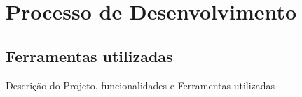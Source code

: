 \section{Processo de Desenvolvimento}

\subsection{Ferramentas utilizadas}
Descrição do Projeto, funcionalidades e Ferramentas utilizadas